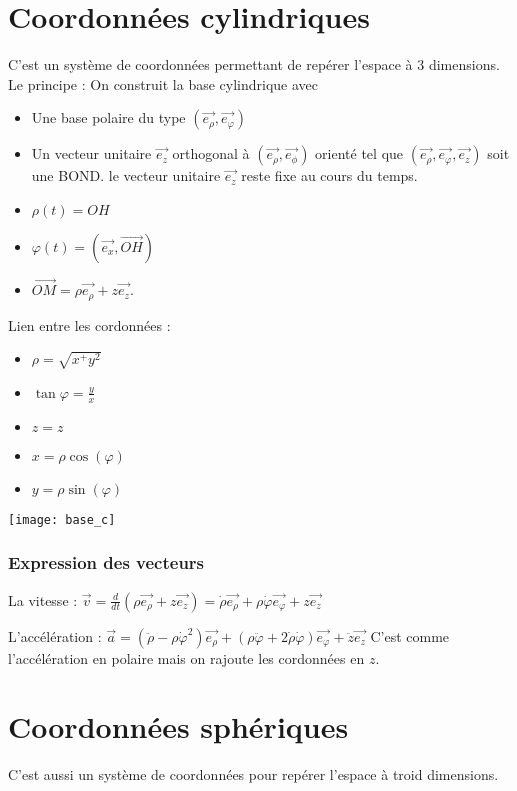 \documentclass[french]{yLectureNote}
\renewcommand{\vec}{\overrightarrow}
\begin{document}
\section{Coordonnées cylindriques}
C'est un système de coordonnées permettant de repérer l'espace à 3 dimensions. Le principe : On construit la base cylindrique avec
\begin{itemize}
 \item Une base polaire du type $(\vec{e_{\rho}},\vec{e_{\varphi}})$
 \item Un vecteur unitaire $\vec{e_z} $ orthogonal à $ (\vec{e_{\rho}},\vec{e_{\phi}})$ orienté tel que $ (\vec{e_{\rho}},\vec{e_{\varphi}}, \vec{e_z})$ soit une BOND. le vecteur unitaire $\vec{e_z}$ reste fixe au cours du temps.
\end{itemize}
\begin{multicols}{2}
\begin{itemize}
 \item $\rho(t) = OH$
 \item $\varphi(t) = (\vec{e_x},\vec{OH})$
 \item $\vec{OM} = \rho\vec{e_{\rho}} + z\vec{e_z}$.
\end{itemize}
Lien entre les cordonnées :
\begin{itemize}
 \item $\rho = \sqrt{x^+y^2}$
 \item $\tan \varphi = \frac{y}{x}$
 \item $z=z$
 \item $x=\rho\cos(\varphi)$
 \item $y= \rho\sin(\varphi)$
\end{itemize}
\columnbreak
\texttt{[image: base\_c]}


\end{multicols}



\subsubsection{Expression des vecteurs}
La vitesse : $\vec{v} = \frac{d}{dt}(\rho\vec{e_{\rho}} + z\vec{e_z}) = \dot{\rho}\vec{e_{\rho}} + \rho\dot{\varphi}\vec{e_{\varphi}} + z\vec{e_z}$

L'accélération : $\vec{a} = (\ddot{\rho}-\rho\dot{\varphi}^2)\vec{e_{\rho}} + (\rho\ddot{\varphi}+2\dot{\rho}\dot{\varphi})\vec{e_{\varphi}} + \ddot{z}\vec{e_z}$ C'est comme l'accélération en polaire mais on rajoute les cordonnées en $z$.
\section{Coordonnées sphériques}
C'est aussi un système de coordonnées pour repérer l'espace à troid dimensions.
\end{document}
